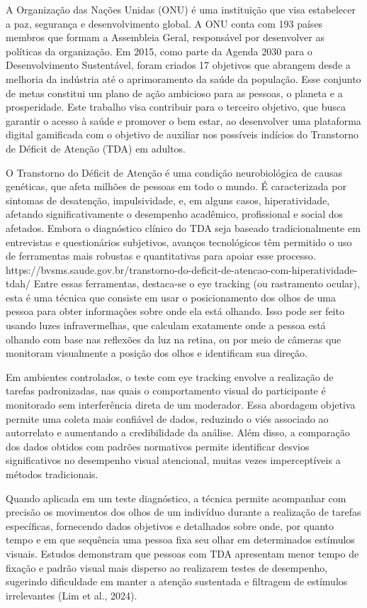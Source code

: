 A Organização das Nações Unidas (ONU) é uma instituição que visa estabelecer a paz,
segurança e desenvolvimento global. A ONU conta com 193 países membros que formam a
Assembleia Geral, responsável por desenvolver as políticas da organização. Em 2015, como
parte da Agenda 2030 para o Desenvolvimento Sustentável, foram criados 17 objetivos que
abrangem desde a melhoria da indústria até o aprimoramento da saúde da população. Esse
conjunto de metas constitui um plano de ação ambicioso para as pessoas, o planeta e a
prosperidade. Este trabalho visa contribuir para o terceiro objetivo, que busca garantir o
acesso à saúde e promover o bem estar, ao desenvolver uma plataforma digital gamificada
com o objetivo de auxiliar nos possíveis indícios do Transtorno de Déficit de Atenção (TDA)
em adultos.

O Transtorno do Déficit de Atenção é uma condição neurobiológica de causas
genéticas, que afeta milhões de pessoas em todo o mundo. É caracterizada por sintomas de
desatenção, impulsividade, e, em alguns casos, hiperatividade, afetando significativamente o
desempenho acadêmico, profissional e social dos afetados. Embora o diagnóstico clínico do
TDA seja baseado tradicionalmente em entrevistas e questionários subjetivos, avanços
tecnológicos têm permitido o uso de ferramentas mais robustas e quantitativas para apoiar
esse processo.
https://bvsms.saude.gov.br/transtorno-do-deficit-de-atencao-com-hiperatividade-tdah/ Entre
essas ferramentas, destaca-se o eye tracking (ou rastramento ocular), esta é uma técnica
que consiste em usar o posicionamento dos olhos de uma pessoa para obter informações
sobre onde ela está olhando. Isso pode ser feito usando luzes infravermelhas, que calculam
exatamente onde a pessoa está olhando com base nas reflexões da luz na retina, ou por
meio de câmeras que monitoram visualmente a posição dos olhos e identificam sua direção.

Em ambientes controlados, o teste com eye tracking envolve a realização de tarefas
padronizadas, nas quais o comportamento visual do participante é monitorado sem
interferência direta de um moderador. Essa abordagem objetiva permite uma coleta mais
confiável de dados, reduzindo o viés associado ao autorrelato e aumentando a credibilidade
da análise. Além disso, a comparação dos dados obtidos com padrões normativos permite
identificar desvios significativos no desempenho visual atencional, muitas vezes
imperceptíveis a métodos tradicionais.

Quando aplicada em um teste diagnóstico, a técnica permite acompanhar com
precisão os movimentos dos olhos de um indivíduo durante a realização de tarefas
específicas, fornecendo dados objetivos e detalhados sobre onde, por quanto tempo e em
que sequência uma pessoa fixa seu olhar em determinados estímulos visuais. Estudos
demonstram que pessoas com TDA apresentam menor tempo de fixação e padrão visual
mais disperso ao realizarem testes de desempenho, sugerindo dificuldade em manter a
atenção sustentada e filtragem de estímulos irrelevantes (Lim et al., 2024).

